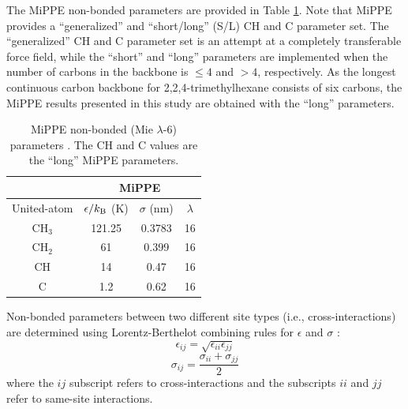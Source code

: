 \documentclass[preprint,review,12pt]{elsarticle}
\begin{document}
	The MiPPE non-bonded parameters are provided in Table \ref{tab:nonbonded params}. Note that MiPPE provides a ``generalized'' and ``short/long'' (S/L) CH and C parameter set. The ``generalized'' CH and C parameter set is an attempt at a completely transferable force field, while the ``short'' and ``long'' parameters are implemented when the number of carbons in the backbone is $\le 4$ and $> 4$, respectively. As the longest continuous carbon backbone for 2,2,4-trimethylhexane consists of six carbons, the MiPPE results presented in this study are obtained with the ``long'' parameters.
	
	\begin{table}[h!]
		\caption{MiPPE non-bonded (Mie $\lambda$-6) parameters \cite{Mie,Potoff_branched}. The CH and C values are the ``long'' MiPPE parameters.} \label{tab:nonbonded params}
		\begin{center}
			\begin{tabular}{|c|c|c|c|}
				\hline
				\multicolumn{1}{|c}{} & \multicolumn{3}{|c|}{MiPPE}  \\ \hline
				United-atom & $\epsilon/k_{\rm B}$ (K) & $\sigma$ (nm) & $\lambda$ \\ \hline
				CH$_3$ & 121.25 & 0.3783 & 16  \\ 
				CH$_2$ & 61 & 0.399 & 16 \\ 
				CH & 14 & 0.47 & 16\\
				C & 1.2 & 0.62 & 16\\
				\hline
			\end{tabular}
		\end{center} 

	\end{table}

\normalsize
	
	Non-bonded parameters between two different site types (i.e., cross-interactions) are determined using Lorentz-Berthelot combining rules for $\epsilon$ and $\sigma$ \cite{Allen2017}:
	\begin{equation} \label{eq:Lorentz-Berthelot_eps}
	\epsilon_{ij} = \sqrt{\epsilon_{ii} \epsilon_{jj}}
	\end{equation}
	\begin{equation} \label{eq:Lorentz-Berthelot_sig}
	\sigma_{ij} = \frac{\sigma_{ii} + \sigma_{jj}}{2}
	\end{equation}
	where the $ij$ subscript refers to cross-interactions and the subscripts $ii$ and $jj$ refer to same-site interactions. 
	
\end{document}
